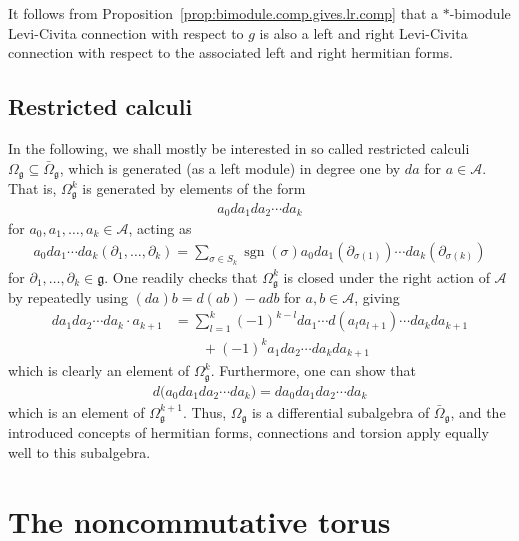 \documentclass{amsart}
\newcommand{\paraa}[1]{\big(#1\big)}
\newcommand{\sgn}{\operatorname{sgn}}
\theoremstyle{definition}
\theoremstyle{remark}
\numberwithin{equation}{section}
\newcommand{\A}{\mathcal{A}}
\renewcommand{\d}{\partial}
\newcommand{\g}{\mathfrak{g}}
\newcommand{\Omegag}[1]{\Omega^{#1}_{\g}}
\newcommand{\Omegabg}[1]{\bar{\Omega}^{#1}_{\g}}
\begin{document}
\noindent
It follows from Proposition~\ref{prop:bimodule.comp.gives.lr.comp}
that a $\ast$-bimodule Levi-Civita connection with respect to $g$ is also a left and right
Levi-Civita connection with respect to the associated left and right hermitian forms.

\subsection{Restricted calculi}

In the following, we shall mostly be interested in so called restricted calculi
$\Omegag{}\subseteq\Omegabg{}$, which is generated (as a left module) in degree one by
$da$ for $a\in\A$. That is, $\Omegag{k}$ is generated by elements of the form
\begin{align*}
  a_0da_1da_2\cdots da_k
\end{align*}
for $a_0,a_1,\ldots,a_k\in\A$, acting as
\begin{align*}
  a_0da_1\cdots da_k(\d_1,\ldots,\d_k) =
  \sum_{\sigma\in S_k}\sgn(\sigma)a_0da_1(\d_{\sigma(1)})\cdots da_k(\d_{\sigma(k)})
\end{align*}
for $\d_1,\ldots,\d_k\in\g$.  One readily checks that $\Omegag{k}$ is
closed under the right action of $\A$ by repeatedly using
$(da)b=d(ab)-adb$ for $a,b\in\A$, giving
\begin{align*}
  da_1da_2\cdots da_k\cdot a_{k+1}
  &= \sum_{l=1}^k(-1)^{k-l}da_1\cdots d(a_la_{l+1})\cdots da_k da_{k+1}\\
      &\qquad+(-1)^ka_1da_2\cdots da_k da_{k+1}
\end{align*}
which is clearly an element of $\Omegag{k}$. Furthermore, one can show that
\begin{align*}
  d\paraa{a_0da_1da_2\cdots da_k} = da_0da_1da_2\cdots da_k
\end{align*}
which is an element of $\Omegag{k+1}$. Thus, $\Omegag{}$ is a
differential subalgebra of $\Omegabg{}$, and the introduced concepts
of hermitian forms, connections and torsion apply equally well to this
subalgebra. 





\section{The noncommutative torus}\label{sec:nc.torus}
\end{document}
